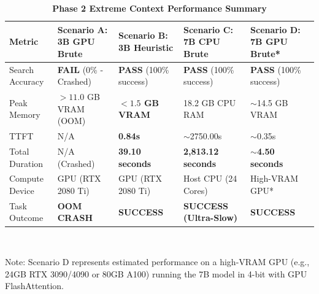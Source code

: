 \documentclass[10pt,twocolumn]{article}
\begin{document}
\begin{table}[t]
\centering
\caption{\textbf{Phase 2 Extreme Context Performance Summary}}
\vspace{0.5em}
\begin{tabular}{lllll}
\toprule
\textbf{Metric} & \textbf{Scenario A: 3B GPU Brute} & \textbf{Scenario B: 3B Heuristic} & \textbf{Scenario C: 7B CPU Brute} & \textbf{Scenario D: 7B GPU Brute*} \\
\midrule
Search Accuracy & \textbf{FAIL} (0\% - Crashed) & \textbf{PASS} (100\% success) & \textbf{PASS} (100\% success) & \textbf{PASS} (100\% success) \\
Peak Memory & $>11.0$ GB VRAM (OOM) & \textbf{$<1.5$ GB VRAM} & 18.2 GB CPU RAM & $\sim$14.5 GB VRAM \\
TTFT & N/A & \textbf{0.84s} & $\sim$2750.00s & $\sim$0.35s \\
Total Duration & N/A (Crashed) & \textbf{39.10 seconds} & \textbf{2,813.12 seconds} & \textbf{$\sim$4.50 seconds} \\
Compute Device & GPU (RTX 2080 Ti) & GPU (RTX 2080 Ti) & Host CPU (24 Cores) & High-VRAM GPU* \\
Task Outcome & \textbf{OOM CRASH} & \textbf{SUCCESS} & \textbf{SUCCESS (Ultra-Slow)} & \textbf{SUCCESS} \\
\bottomrule
\end{tabular}
\vspace{0.3em}
\small \\ \raggedright \quad *Note: Scenario D represents estimated performance on a high-VRAM GPU (e.g., 24GB RTX 3090/4090 or 80GB A100) running the 7B model in 4-bit with GPU FlashAttention.
\end{table}
\end{document}
